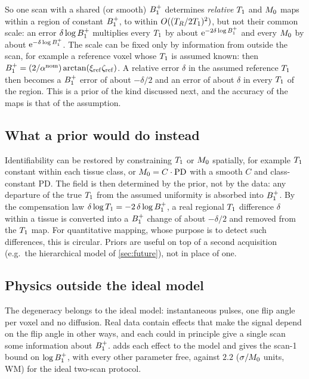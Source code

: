 So one scan with a shared (or smooth) $B_1^{+}$ determines \emph{relative} $T_1$ and $M_0$ maps
within a region of constant $B_1^{+}$, to within $O((T_R/2T_1)^2)$, but not their common scale: an
error $\delta\log B_1^{+}$ multiplies every $T_1$ by about $\mathrm{e}^{-2\delta\log B_1^{+}}$ and every $M_0$ by about
$\mathrm{e}^{-\delta\log B_1^{+}}$. The scale can be fixed only by information from outside the scan, for example a
reference voxel whose $T_1$ is assumed known: then $B_1^{+}=(2/\alpha^{\rm nom})\arctan(\xi_{\rm ref}\zeta_{\rm ref})$.
A relative error $\delta$ in the assumed reference $T_1$ then becomes a $B_1^{+}$ error of about $-\delta/2$
and an error of about $\delta$ in every $T_1$ of the region. This is a prior of the kind discussed
next, and the accuracy of the maps is that of the assumption.

\subsection{What a prior would do instead}

Identifiability can be restored by constraining $T_1$ or $M_0$ spatially, for example $T_1$
constant within each tissue class, or $M_0=C\cdot\mathrm{PD}$ with a smooth $C$ and class-constant $\mathrm{PD}$. The
field is then determined by the prior, not by the data: any departure of the true $T_1$ from the
assumed uniformity is absorbed into $B_1^{+}$. By the compensation law $\delta\log T_1=-2\,\delta\log B_1^{+}$, a real
regional $T_1$ difference $\delta$ within a tissue is converted into a $B_1^{+}$ change of about $-\delta/2$ and
removed from the $T_1$ map. For quantitative mapping, whose purpose is to detect such
differences, this is circular. Priors are useful on top of a second acquisition (e.g.\ the
hierarchical model of \cref{sec:future}), not in place of one.

\subsection{Physics outside the ideal model}\label{sec:beyond}

The degeneracy belongs to the ideal model: instantaneous pulses, one flip angle per voxel and
no diffusion. Real data contain effects that make the signal depend on the flip angle in other
ways, and each could in principle give a single scan some information about $B_1^{+}$.
 adds each effect to the model and gives the scan-1 bound on $\log B_1^{+}$, with every
other parameter free, against $2.2$ ($\sigma/M_0$ units, WM) for the ideal two-scan protocol.

